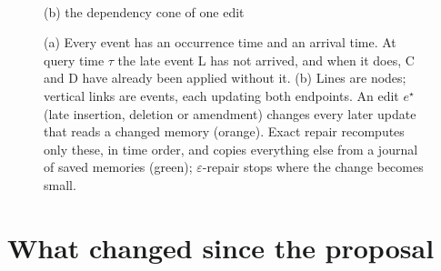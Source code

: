 \documentclass{article}
\begin{document}
\begin{figure}[t]
\begin{minipage}[b]{0.50\linewidth}
\\[2pt]{\footnotesize (b) the dependency cone of one edit}
\end{minipage}
\caption{(a) Every event has an occurrence time and an arrival time. At query time $\tau$ the late event L has not
arrived, and when it does, C and D have already been applied without it. (b) Lines are nodes; vertical links are events,
each updating both endpoints. An edit $e^\star$ (late insertion, deletion or amendment) changes every later update that
reads a changed memory (orange). Exact repair recomputes only these, in time order, and copies everything else from a
journal of saved memories (green); $\varepsilon$-repair stops where the change becomes small.}
\label{fig:concept}
\end{figure}


\section{What changed since the proposal}
\label{sec:changes}
\end{document}
